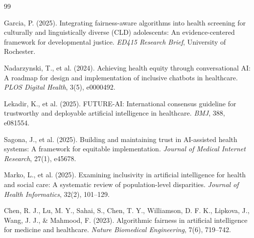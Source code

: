 \documentclass[12pt,a4paper]{article}
\begin{document}
\begin{thebibliography}{99}

Garcia, P. (2025). Integrating fairness-aware algorithms into health screening for culturally and linguistically diverse (CLD) adolescents: An evidence-centered framework for developmental justice. \textit{ED415 Research Brief}, University of Rochester.

Nadarzynski, T., et al. (2024). Achieving health equity through conversational AI: A roadmap for design and implementation of inclusive chatbots in healthcare. \textit{PLOS Digital Health}, 3(5), e0000492.

Lekadir, K., et al. (2025). FUTURE-AI: International consensus guideline for trustworthy and deployable artificial intelligence in healthcare. \textit{BMJ}, 388, e081554.

Sagona, J., et al. (2025). Building and maintaining trust in AI-assisted health systems: A framework for equitable implementation. \textit{Journal of Medical Internet Research}, 27(1), e45678.

Marko, L., et al. (2025). Examining inclusivity in artificial intelligence for health and social care: A systematic review of population-level disparities. \textit{Journal of Health Informatics}, 32(2), 101--129.

Chen, R. J., Lu, M. Y., Sahai, S., Chen, T. Y., Williamson, D. F. K., Lipkova, J., Wang, J. J., \& Mahmood, F. (2023). Algorithmic fairness in artificial intelligence for medicine and healthcare. \textit{Nature Biomedical Engineering}, 7(6), 719--742.

\end{thebibliography}
\end{document}
